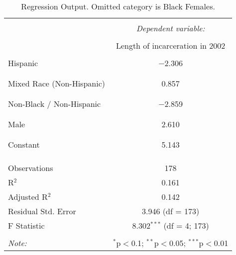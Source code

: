 
\begin{table}[!htbp] \centering 
  \caption{Regression Output. Omitted category is Black Females.} 
  \label{tab:regression} 
\begin{tabular}{@{\extracolsep{5pt}}lc} 
\\[-1.8ex]\hline 
\hline \\[-1.8ex] 
 & \multicolumn{1}{c}{\textit{Dependent variable:}} \\ 
\cline{2-2} 
\\[-1.8ex] & Length of incarceration in 2002 \\ 
\hline \\[-1.8ex] 
 Hispanic & $-$2.306 \\ 
  &  \\ 
  & \\ 
 Mixed Race (Non-Hispanic) & 0.857 \\ 
  &  \\ 
  & \\ 
 Non-Black / Non-Hispanic & $-$2.859 \\ 
  &  \\ 
  & \\ 
 Male & 2.610 \\ 
  &  \\ 
  & \\ 
 Constant & 5.143 \\ 
  &  \\ 
  & \\ 
\hline \\[-1.8ex] 
Observations & 178 \\ 
R$^{2}$ & 0.161 \\ 
Adjusted R$^{2}$ & 0.142 \\ 
Residual Std. Error & 3.946 (df = 173) \\ 
F Statistic & 8.302$^{***}$ (df = 4; 173) \\ 
\hline 
\hline \\[-1.8ex] 
\textit{Note:}  & \multicolumn{1}{r}{$^{*}$p$<$0.1; $^{**}$p$<$0.05; $^{***}$p$<$0.01} \\ 
\end{tabular} 
\end{table} 
